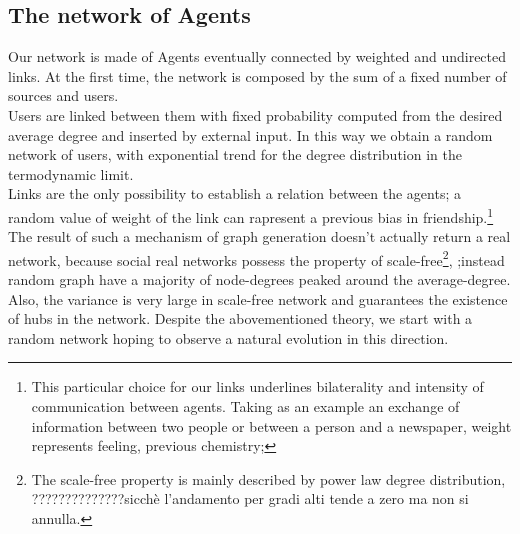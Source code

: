\documentclass[11pt]{article} %
\begin{document}
\subsection{The network of Agents}
Our network is made of Agents eventually connected by  weighted and undirected links.
At the first time, the network is composed by the sum of a fixed number of sources and users. \\
Users are linked between them with fixed probability computed from the desired average degree and inserted by external input.
 In this way we obtain a random network of users, with exponential trend for the degree distribution in the termodynamic limit.
\\ Links are the only possibility to establish a relation between the agents; a random value of weight of the link can rapresent a previous bias in 
friendship.\footnote{This particular choice for our links underlines bilaterality and intensity of communication between agents.
Taking as an example an exchange of information between two people or between a person and a newspaper, weight represents feeling, previous chemistry;}
The result of such a  mechanism of graph generation doesn't actually return a real network, because social real networks possess the property of 
scale-free\footnote{The scale-free property is mainly described by power law degree distribution, ??????????????sicchè l'andamento per gradi alti tende a zero ma non si annulla. },
 ;instead random graph have a majority of node-degrees peaked around the average-degree. 
Also, the variance is very large in scale-free network and guarantees the existence of hubs in the network.
Despite the abovementioned theory, we start with a random network hoping to observe a natural evolution in this direction.
\\
\end{document}
